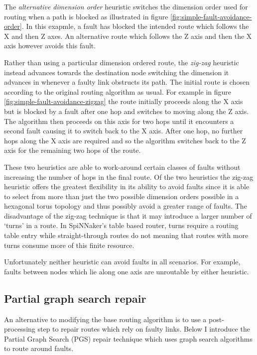 			The \emph{alternative dimension order} heuristic switches the dimension
			order used for routing when a path is blocked as illustrated in figure
			\ref{fig:simple-fault-avoidance-order}. In this exapmle, a fault has
			blocked the intended route which follows the X and then Z axes. An
			alternative route which follows the Z axis and then the X axis however
			avoids this fault.
			
			Rather than using a particular dimension ordered route, the
			\emph{zig-zag} heuristic instead advances towards the destination node
			switching the dimension it advances in whenever a faulty link obstructs
			its path. The initial route is chosen according to the original routing
			algorithm as usual. For example in figure
			\ref{fig:simple-fault-avoidance-zigzag} the route initially proceeds
			along the X axis but is blocked by a fault after one hop and switches to
			moving along the Z axis. The algorithm then proceeds on this axis for two
			hops until it encounters a second fault causing it to switch back to the
			X axis. After one hop, no further hops along the X axis are required and
			so the algorithm switches back to the Z axis for the remaining two hops
			of the route.
			
			These two heuristics are able to work-around certain classes of faults
			without increasing the number of hops in the final route. Of the two
			heuristics the zig-zag heuristic offers the greatest flexibility in its
			ability to avoid faults since it is able to select from more than just
			the two possible dimension orders possible in a hexagonal torus topology
			and thus possibly avoid a greater range of faults. The disadvantage of
			the zig-zag technique is that it may introduce a larger number of `turns'
			in a route. In SpiNNaker's table based router, turns require a routing
			table entry while straight-through routes do not meaning that routes with
			more turns consume more of this finite resource.
			
			Unfortunately neither heuristic can avoid faults in all scenarios. For
			example, faults between nodes which lie along one axis are unroutable by
			either heuristic.
		
		\subsection{Partial graph search repair}
			
			An alternative to modifying the base routing algorithm is to use a
			post-processing step to repair routes which rely on faulty links. Below I
			introduce the Partial Graph Search (PGS) repair technique which uses
			graph search algorithms to route around faults.
			
